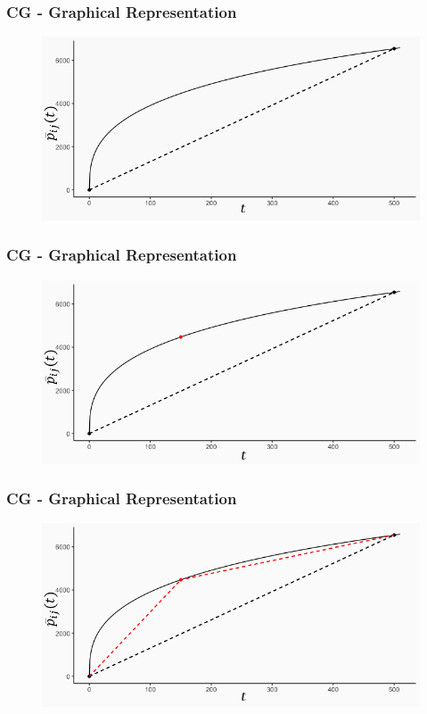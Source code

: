 \begin{frame}
\frametitle{CG - Graphical Representation}
\begin{center}
\begin{figure}
    \centering
    \includegraphics[width=\linewidth]{plot2.png}
\end{figure}
\end{center}
\end{frame}

\begin{frame}
\frametitle{CG - Graphical Representation}
\begin{center}
\begin{figure}
    \centering
    \includegraphics[width=\linewidth]{plot3.png}
\end{figure}
\end{center}
\end{frame}

\begin{frame}
\frametitle{CG - Graphical Representation}
\begin{center}
\begin{figure}
    \centering
    \includegraphics[width=\linewidth]{plot4.png}
\end{figure}
\end{center}
\end{frame}

